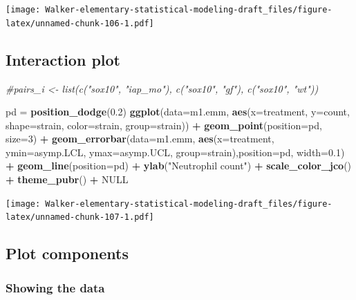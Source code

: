 \documentclass[]{book}
\newenvironment{Shaded}{\begin{snugshade}}{\end{snugshade}}
\newcommand{\CommentTok}[1]{\textcolor[rgb]{0.56,0.35,0.01}{\textit{#1}}}
\newcommand{\DataTypeTok}[1]{\textcolor[rgb]{0.13,0.29,0.53}{#1}}
\newcommand{\DecValTok}[1]{\textcolor[rgb]{0.00,0.00,0.81}{#1}}
\newcommand{\FloatTok}[1]{\textcolor[rgb]{0.00,0.00,0.81}{#1}}
\newcommand{\KeywordTok}[1]{\textcolor[rgb]{0.13,0.29,0.53}{\textbf{#1}}}
\newcommand{\NormalTok}[1]{#1}
\newcommand{\OperatorTok}[1]{\textcolor[rgb]{0.81,0.36,0.00}{\textbf{#1}}}
\newcommand{\OtherTok}[1]{\textcolor[rgb]{0.56,0.35,0.01}{#1}}
\newcommand{\StringTok}[1]{\textcolor[rgb]{0.31,0.60,0.02}{#1}}
\begin{document}
\texttt{[image: Walker-elementary-statistical-modeling-draft\_files/figure-latex/unnamed-chunk-106-1.pdf]}

\hypertarget{interaction-plot}{%
\subsection{Interaction plot}\label{interaction-plot}}

\begin{Shaded}
\begin{Highlighting}[]
\CommentTok{#pairs_i <- list(c("sox10", "iap_mo"), c("sox10", "gf"), c("sox10", "wt"))}

\NormalTok{pd =}\StringTok{ }\KeywordTok{position_dodge}\NormalTok{(}\FloatTok{0.2}\NormalTok{)}
\KeywordTok{ggplot}\NormalTok{(}\DataTypeTok{data=}\NormalTok{m1.emm, }\KeywordTok{aes}\NormalTok{(}\DataTypeTok{x=}\NormalTok{treatment, }\DataTypeTok{y=}\NormalTok{count, }\DataTypeTok{shape=}\NormalTok{strain, }\DataTypeTok{color=}\NormalTok{strain, }\DataTypeTok{group=}\NormalTok{strain)) }\OperatorTok{+}
\StringTok{  }\KeywordTok{geom_point}\NormalTok{(}\DataTypeTok{position=}\NormalTok{pd, }\DataTypeTok{size=}\DecValTok{3}\NormalTok{) }\OperatorTok{+}
\StringTok{  }\KeywordTok{geom_errorbar}\NormalTok{(}\DataTypeTok{data=}\NormalTok{m1.emm, }\KeywordTok{aes}\NormalTok{(}\DataTypeTok{x=}\NormalTok{treatment, }\DataTypeTok{ymin=}\NormalTok{asymp.LCL, }\DataTypeTok{ymax=}\NormalTok{asymp.UCL, }\DataTypeTok{group=}\NormalTok{strain),}\DataTypeTok{position=}\NormalTok{pd, }\DataTypeTok{width=}\FloatTok{0.1}\NormalTok{) }\OperatorTok{+}
\StringTok{  }\KeywordTok{geom_line}\NormalTok{(}\DataTypeTok{position=}\NormalTok{pd) }\OperatorTok{+}
\StringTok{  }\KeywordTok{ylab}\NormalTok{(}\StringTok{"Neutrophil count"}\NormalTok{) }\OperatorTok{+}
\StringTok{  }\KeywordTok{scale_color_jco}\NormalTok{() }\OperatorTok{+}
\StringTok{  }\KeywordTok{theme_pubr}\NormalTok{() }\OperatorTok{+}
\StringTok{  }\OtherTok{NULL}
\end{Highlighting}
\end{Shaded}

\texttt{[image: Walker-elementary-statistical-modeling-draft\_files/figure-latex/unnamed-chunk-107-1.pdf]}

\hypertarget{plot-components}{%
\subsection{Plot components}\label{plot-components}}

\hypertarget{showing-the-data}{%
\subsubsection{Showing the data}\label{showing-the-data}}
\end{document}
